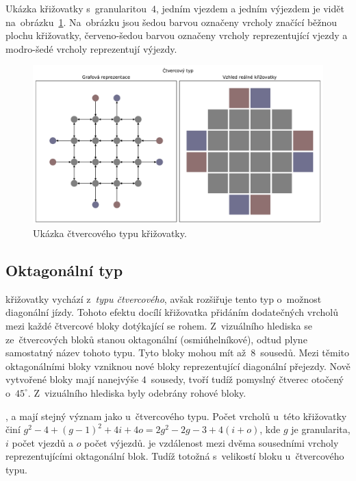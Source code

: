Ukázka křižovatky s~granularitou~$4$, jedním vjezdem a jedním výjezdem je vidět na~obrázku~\ref{fig:square_type_graph}.  %
Na~obrázku jsou šedou barvou označeny vrcholy značící běžnou plochu křižovatky,
červeno-šedou barvou označeny vrcholy reprezentující vjezdy a modro-šedé vrcholy reprezentují výjezdy.

\begin{figure}[h]
  \centering
  \includegraphics[width=\textwidth]{../img/Square_grid}
  \caption{Ukázka čtvercového typu křižovatky.}
  \label{fig:square_type_graph}
\end{figure}

\subsection{Oktagonální typ}\label{subsec:oktagonalni_typ}

 křižovatky vychází z~\emph{typu čtvercového},  %
avšak rozšiřuje tento typ o~možnost diagonální jízdy.
Tohoto efektu docílí křižovatka přidáním dodatečných vrcholů mezi každé čtvercové bloky dotýkající se rohem.
Z~vizuálního hlediska se ze~čtvercových bloků stanou oktagonální (osmiúhelníkové),
odtud plyne samostatný název tohoto typu.
Tyto bloky mohou mít až~$8$~sousedů.
Mezi těmito oktagonálními bloky vzniknou nové bloky reprezentující diagonální přejezdy.
Nově vytvořené bloky mají nanejvýše $4$~sousedy, tvoří tudíž pomyslný čtverec otočený o~$45^{\circ}$.
Z~vizuálního hlediska byly odebrány rohové bloky.

,  a  mají stejný význam jako u~čtvercového typu.  %
Počet vrcholů u~této křižovatky činí $g^2 - 4 + (g-1)^2 + 4i + 4o = 2g^2 - 2g - 3 + 4(i + o)$,
kde $g$ je granularita, $i$ počet vjezdů a $o$ počet výjezdů.  %
 je vzdálenost mezi dvěma sousedními vrcholy reprezentujícími oktagonální blok.
Tudíž totožná s~velikostí bloku u~čtvercového typu.


